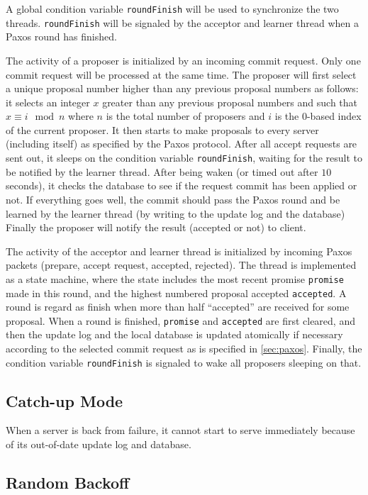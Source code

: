 \documentclass[11pt]{article}
\begin{document}
A global condition variable \texttt{roundFinish} will be used to synchronize the two threads.
\texttt{roundFinish} will be signaled by the acceptor and learner thread when a Paxos round has finished.

The activity of a proposer is initialized by an incoming commit request.
Only one commit request will be processed at the same time.
The proposer will first select a unique proposal number higher than any previous proposal numbers as follows:
it selects an integer $x$ greater than any previous proposal numbers and such that $x \equiv i \mod n$ where $n$ is the total number of proposers and $i$ is the $0$-based index of the current proposer.
It then starts to make proposals to every server (including itself) as specified by the Paxos protocol.
After all accept requests are sent out, it sleeps on the condition variable \texttt{roundFinish}, waiting for the result to be notified by the learner thread.
After being waken (or timed out after $10$ seconds), it checks the database to see if the request commit has been applied or not.
If everything goes well, the commit should pass the Paxos round and be learned by the learner thread (by writing to the update log and the database)
Finally the proposer will notify the result (accepted or not) to client.

The activity of the acceptor and learner thread is initialized by incoming Paxos packets (prepare, accept request, accepted, rejected).
The thread is implemented as a state machine, where the state includes the most recent promise \texttt{promise} made in this round, and the highest numbered proposal accepted \texttt{accepted}.
A round is regard as finish when more than half ``accepted'' are received for some proposal.
When a round is finished, \texttt{promise} and \texttt{accepted} are first cleared, and then the update log and the local database is updated atomically if necessary according to the selected commit request as is specified in \ref{sec:paxos}.
Finally, the condition variable \texttt{roundFinish} is signaled to wake all proposers sleeping on that.

\subsection{Catch-up Mode}
When a server is back from failure, it cannot start to serve immediately because of its out-of-date update log and database.


\subsection{Random Backoff}
\end{document}
